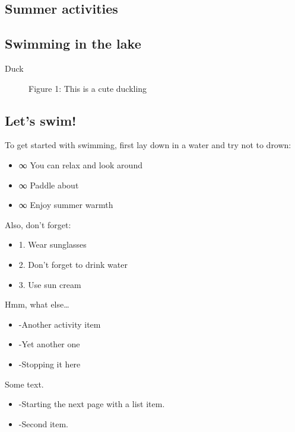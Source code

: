 \subsection{Summer activities}

\subsection{Swimming in the lake}

Duck

\begin{figure}[h]
\caption{Figure 1: This is a cute duckling}
\end{figure}

\subsection{Let's swim!}

To get started with swimming, first lay down in a water and try not to drown:

\begin{itemize}
\item ∞ You can relax and look around
\item ∞ Paddle about
\item ∞ Enjoy summer warmth
\end{itemize}

Also, don't forget:

\begin{itemize}
\item 1. Wear sunglasses
\item 2. Don't forget to drink water
\item 3. Use sun cream
\end{itemize}

Hmm, what else…

\begin{itemize}
\item -Another activity item
\item -Yet another one
\item -Stopping it here
\end{itemize}

Some text.

\begin{itemize}
\item -Starting the next page with a list item.
\item -Second item.
\end{itemize}
